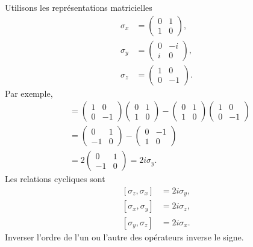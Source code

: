 Utilisons les représentations matricielles
\begin{equation}
\begin{aligned}
\sigma_x&=
\begin{pmatrix}0&1\\1&0\end{pmatrix},\\[0.4em]
\sigma_y&=
\begin{pmatrix}0&-i\\i&0\end{pmatrix},\\[0.4em]
\sigma_z&=
\begin{pmatrix}1&0\\0&-1\end{pmatrix}.
\end{aligned}
\end{equation}
Par exemple,
\begin{align}
[\sigma_z,\sigma_x]
&=
\begin{pmatrix}1&0\\0&-1\end{pmatrix}
\begin{pmatrix}0&1\\1&0\end{pmatrix}
-
\begin{pmatrix}0&1\\1&0\end{pmatrix}
\begin{pmatrix}1&0\\0&-1\end{pmatrix}\\
&=
\begin{pmatrix}0&1\\-1&0\end{pmatrix}
-
\begin{pmatrix}0&-1\\1&0\end{pmatrix}\\
&=2
\begin{pmatrix}0&1\\-1&0\end{pmatrix}
=2i\sigma_y.
\end{align}
Les relations cycliques sont
\begin{equation}
\begin{aligned}
[\sigma_z,\sigma_x]&=2i\sigma_y,\\
[\sigma_x,\sigma_y]&=2i\sigma_z,\\
[\sigma_y,\sigma_z]&=2i\sigma_x.
\end{aligned}
\label{eq:l5-pauli-commutators}
\end{equation}
Inverser l’ordre de l’un ou l’autre des opérateurs inverse le signe.

